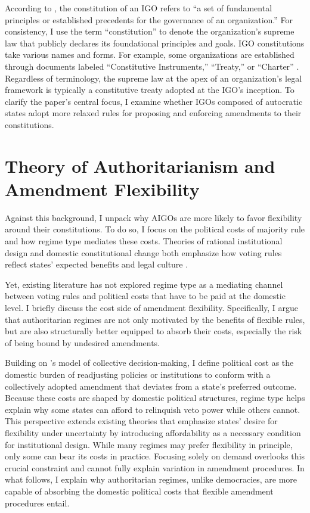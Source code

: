 \documentclass[12pt]{article}
\begin{document}
According to \textcite{hooghe_international_2017}, the constitution of an IGO refers to ``a set of fundamental principles or established precedents for the governance of an organization.'' For consistency, I use the term ``constitution'' to denote the organization's supreme law that publicly declares its foundational principles and goals. IGO constitutions take various names and forms. For example, some organizations are established through documents labeled ``Constitutive Instruments,'' ``Treaty,'' or ``Charter'' \parencite{hooghe_constructing_2017}. Regardless of terminology, the supreme law at the apex of an organization's legal framework is typically a constitutive treaty adopted at the IGO's inception. To clarify the paper's central focus, I examine whether IGOs composed of autocratic states adopt more relaxed rules for proposing and enforcing amendments to their constitutions.

\section{Theory of Authoritarianism and Amendment Flexibility}

Against this background, I unpack why AIGOs are more likely to favor flexibility around their constitutions. To do so, I focus on the political costs of majority rule and how regime type mediates these costs. Theories of rational institutional design and domestic constitutional change both emphasize how voting rules reflect states' expected benefits and legal culture \parencite{ginsburg_does_2015}. 

Yet, existing literature has not explored regime type as a mediating channel between voting rules and political costs that have to be paid at the domestic level. I briefly discuss the cost side of amendment flexibility. Specifically, I argue that authoritarian regimes are not only motivated by the benefits of flexible rules, but are also structurally better equipped to absorb their costs, especially the risk of being bound by undesired amendments.

Building on \textcite{buchanan_calculus_1965}'s model of collective decision-making, I define political cost as the domestic burden of readjusting policies or institutions to conform with a collectively adopted amendment that deviates from a state's preferred outcome. Because these costs are shaped by domestic political structures, regime type helps explain why some states can afford to relinquish veto power while others cannot. This perspective extends existing theories that emphasize states' desire for flexibility under uncertainty by introducing affordability as a necessary condition for institutional design. While many regimes may prefer flexibility in principle, only some can bear its costs in practice. Focusing solely on demand overlooks this crucial constraint and cannot fully explain variation in amendment procedures. In what follows, I explain why authoritarian regimes, unlike democracies, are more capable of absorbing the domestic political costs that flexible amendment procedures entail.
\end{document}
